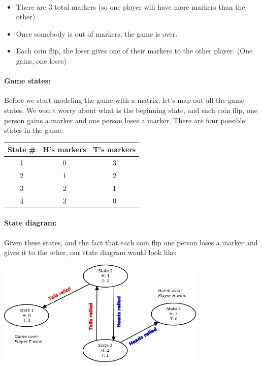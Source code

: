 {\begin{intro}{\ }
            \begin{itemize}
                \item   There are 3 total markers (so one player will have
                more markers than the other)

                \item   Once somebody is out of markers, the game is over.

                \item   Each coin flip, the loser gives one of their markers
                to the other player. (One gains, one loses)
            \end{itemize}
            
            \paragraph{Game states:} Before we start modeling the game
            with a matrix, let's map out all the game states.
            We won't worry about what is the
            beginning state, and each coin flip, one person gains a marker
            and one person loses a marker. There are four possible states
             in the game:

             \begin{center}
                 \begin{tabular}{c c c}
                     State \# & H's markers & T's markers \\ \hline
                     1 & 0 & 3 \\
                     2 & 1 & 2 \\
                     3 & 2 & 1 \\
                     4 & 3 & 0
                 \end{tabular}
             \end{center}

            \paragraph{State diagram:}  Given these states,
            and the fact that each coin flip one person loses a marker
            and gives it to the other, our state diagram
            would look like:
            
            \begin{center}
                \includegraphics[width=10cm]{images/6-6-states.png}
            \end{center}


\end{intro}}
